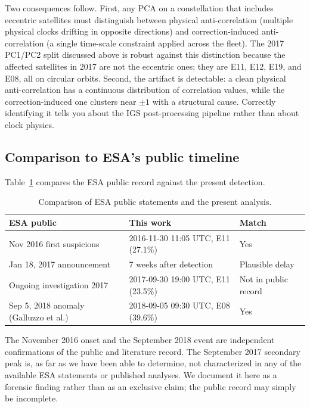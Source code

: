 \documentclass[11pt,a4paper]{article}
\begin{document}
Two consequences follow. First, any PCA on a constellation that includes eccentric satellites must distinguish between physical anti-correlation (multiple physical clocks drifting in opposite directions) and correction-induced anti-correlation (a single time-scale constraint applied across the fleet). The 2017 PC1/PC2 split discussed above is robust against this distinction because the affected satellites in 2017 are not the eccentric ones; they are E11, E12, E19, and E08, all on circular orbits. Second, the artifact is detectable: a clean physical anti-correlation has a continuous distribution of correlation values, while the correction-induced one clusters near $\pm 1$ with a structural cause. Correctly identifying it tells you about the IGS post-processing pipeline rather than about clock physics.

\subsection{Comparison to ESA's public timeline}

Table~\ref{tab:esa-vs-this} compares the ESA public record against the present detection.

\begin{table}[h]
    \centering
    \caption{Comparison of ESA public statements and the present analysis.}
    \label{tab:esa-vs-this}
    \begin{tabular}{ll l}
        \toprule
        ESA public & This work & Match \\
        \midrule
        Nov 2016 first suspicions & 2016-11-30 11:05 UTC, E11 (27.1\%) & Yes \\
        Jan 18, 2017 announcement & 7 weeks after detection & Plausible delay \\
        Ongoing investigation 2017 & 2017-09-30 19:00 UTC, E11 (23.5\%) & Not in public record \\
        Sep 5, 2018 anomaly (Galluzzo et al.) & 2018-09-05 09:30 UTC, E08 (39.6\%) & Yes \\
        \bottomrule
    \end{tabular}
\end{table}

The November 2016 onset and the September 2018 event are independent confirmations of the public and literature record. The September 2017 secondary peak is, as far as we have been able to determine, not characterized in any of the available ESA statements or published analyses. We document it here as a forensic finding rather than as an exclusive claim; the public record may simply be incomplete.
\end{document}
